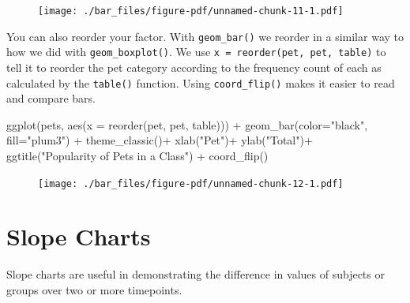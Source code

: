 \documentclass[
  letterpaper,
  DIV=11,
  numbers=noendperiod]{scrreprt}
\newenvironment{Shaded}{\begin{snugshade}}{\end{snugshade}}
\newcommand{\AttributeTok}[1]{\textcolor[rgb]{0.40,0.45,0.13}{#1}}
\newcommand{\FunctionTok}[1]{\textcolor[rgb]{0.28,0.35,0.67}{#1}}
\newcommand{\NormalTok}[1]{\textcolor[rgb]{0.00,0.23,0.31}{#1}}
\newcommand{\SpecialCharTok}[1]{\textcolor[rgb]{0.37,0.37,0.37}{#1}}
\newcommand{\StringTok}[1]{\textcolor[rgb]{0.13,0.47,0.30}{#1}}
\begin{document}
\begin{figure}[H]

{\centering \texttt{[image: ./bar\_files/figure-pdf/unnamed-chunk-11-1.pdf]}

}

\end{figure}

You can also reorder your factor. With \texttt{geom\_bar()} we reorder
in a similar way to how we did with \texttt{geom\_boxplot()}. We use
\texttt{x\ =\ reorder(pet,\ pet,\ table)} to tell it to reorder the pet
category according to the frequency count of each as calculated by the
\texttt{table()} function. Using \texttt{coord\_flip()} makes it easier
to read and compare bars.

\begin{Shaded}
\begin{Highlighting}[]
\FunctionTok{ggplot}\NormalTok{(pets, }\FunctionTok{aes}\NormalTok{(}\AttributeTok{x =} \FunctionTok{reorder}\NormalTok{(pet, pet, table))) }\SpecialCharTok{+} 
  \FunctionTok{geom\_bar}\NormalTok{(}\AttributeTok{color=}\StringTok{"black"}\NormalTok{, }\AttributeTok{fill=}\StringTok{"plum3"}\NormalTok{) }\SpecialCharTok{+}
  \FunctionTok{theme\_classic}\NormalTok{()}\SpecialCharTok{+}
  \FunctionTok{xlab}\NormalTok{(}\StringTok{"Pet"}\NormalTok{)}\SpecialCharTok{+}
  \FunctionTok{ylab}\NormalTok{(}\StringTok{"Total"}\NormalTok{)}\SpecialCharTok{+}
  \FunctionTok{ggtitle}\NormalTok{(}\StringTok{"Popularity of Pets in a Class"}\NormalTok{) }\SpecialCharTok{+}
  \FunctionTok{coord\_flip}\NormalTok{()}
\end{Highlighting}
\end{Shaded}

\begin{figure}[H]

{\centering \texttt{[image: ./bar\_files/figure-pdf/unnamed-chunk-12-1.pdf]}

}

\end{figure}


\hypertarget{slope-charts}{%
\chapter{Slope Charts}\label{slope-charts}}

Slope charts are useful in demonstrating the difference in values of
subjects or groups over two or more timepoints.
\end{document}
